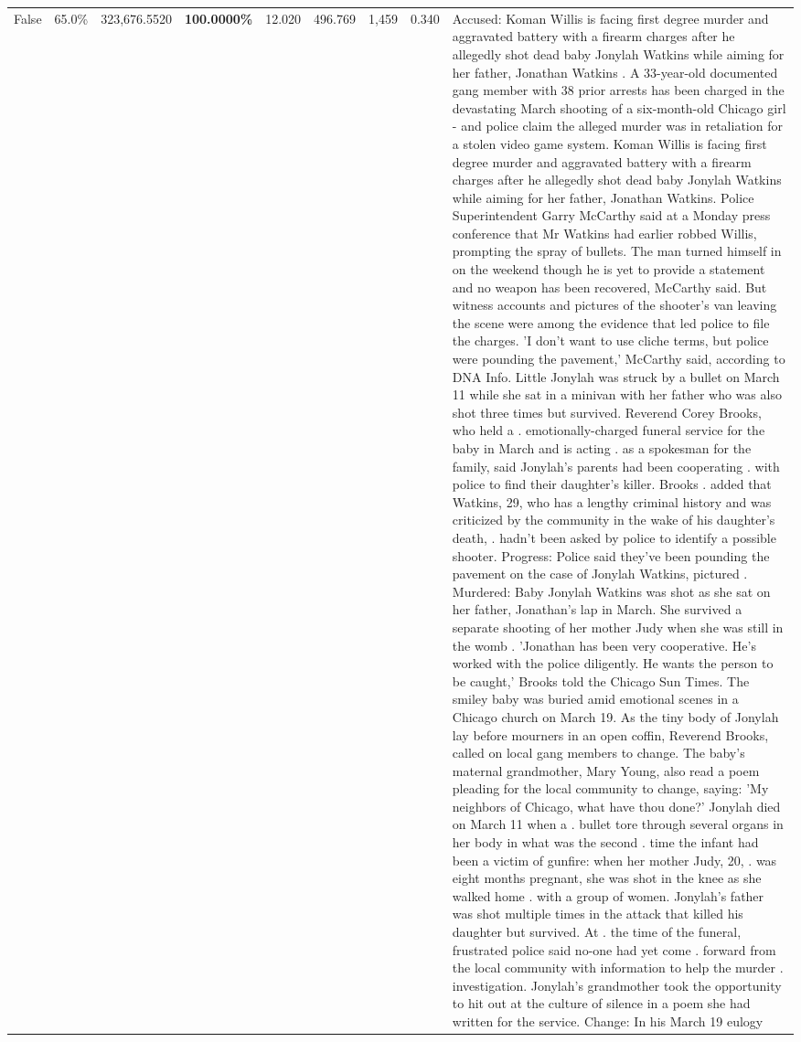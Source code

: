 \begin{table}[H]
\begin{tabular}{lllrlllll}
False & 65.0\% & 323,676.5520 & \bfseries \color{red} 100.0000\% & 12.020 & 496.769 & 1,459 & 0.340 & Accused: Koman Willis is facing first degree murder and aggravated battery with a firearm charges after he allegedly shot dead baby Jonylah Watkins while aiming for her father, Jonathan Watkins . A 33-year-old documented gang member with 38 prior arrests has been charged in the devastating March shooting of a six-month-old Chicago girl - and police claim the alleged murder was in retaliation for a stolen video game system. Koman Willis is facing first degree murder and aggravated battery with a firearm charges after he allegedly shot dead baby Jonylah Watkins while aiming for her father, Jonathan Watkins. Police Superintendent Garry McCarthy said at a Monday press conference that Mr Watkins had earlier robbed Willis, prompting the spray of bullets. The man turned himself in on the weekend though he is yet to provide a statement and no weapon has been recovered, McCarthy said. But witness accounts and pictures of the shooter's van leaving the scene were among the evidence that led police to file the charges. 'I don't want to use cliche terms, but police were pounding the pavement,' McCarthy said, according to DNA Info. Little Jonylah was struck by a bullet on March 11 while she sat in a minivan with her father who was also shot three times but survived. Reverend Corey Brooks, who held a . emotionally-charged funeral service for the baby in March and is acting . as a spokesman for the family, said Jonylah's parents had been cooperating . with police to find their daughter's killer. Brooks . added that Watkins, 29, who has a lengthy criminal history and was criticized by the community in the wake of his daughter's death, . hadn't been asked by police to identify a possible shooter. Progress: Police said they've been pounding the pavement on the case of Jonylah Watkins, pictured . Murdered: Baby Jonylah Watkins was shot as she sat on her father, Jonathan's lap in March. She survived a separate shooting of her mother Judy when she was still in the womb . 'Jonathan has been very cooperative. He's worked with the police diligently. He wants the person to be caught,' Brooks told the Chicago Sun Times. The smiley baby was buried amid emotional scenes in a Chicago church on March 19. As the tiny body of Jonylah lay before mourners in an open coffin, Reverend Brooks, called on local gang members to change. The baby's maternal grandmother, Mary Young, also read a poem pleading for the local community to change, saying: 'My neighbors of Chicago, what have thou done?' Jonylah died on March 11 when a . bullet tore through several organs in her body in what was the second . time the infant had been a victim of gunfire: when her mother Judy, 20, . was eight months pregnant, she was shot in the knee as she walked home . with a group of women. Jonylah's father was shot multiple times in the attack that killed his daughter but survived. At . the time of the funeral, frustrated police said no-one had yet come . forward from the local community with information to help the murder . investigation. Jonylah's grandmother took the opportunity to hit out at the culture of silence in a poem she had written for the service. Change: In his March 19 eulogy 
\end{tabular}
\end{table}
